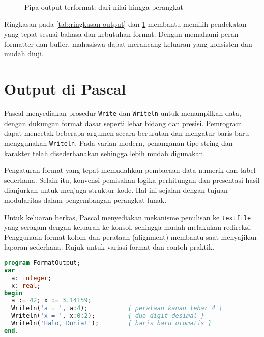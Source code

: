 \documentclass[../main.tex]{subfiles}
\begin{document}
\begin{figure}[h]
  \centering
  \caption{Pipa output terformat: dari nilai hingga perangkat}
  \label{fig:pipa-output}
\end{figure}

Ringkasan pada \cref{tab:ringkasan-output} dan \cref{fig:pipa-output} membantu memilih pendekatan yang tepat sesuai bahasa dan kebutuhan format. Dengan memahami peran formatter dan buffer, mahasiswa dapat merancang keluaran yang konsisten dan mudah diuji.

\section{Output di Pascal}
Pascal menyediakan prosedur \texttt{Write} dan \texttt{Writeln} untuk menampilkan data, dengan dukungan format dasar seperti lebar bidang dan presisi. Pemrogram dapat mencetak beberapa argumen secara berurutan dan mengatur baris baru menggunakan \texttt{Writeln}. Pada varian modern, penanganan tipe string dan karakter telah disederhanakan sehingga lebih mudah digunakan.

Pengaturan format yang tepat memudahkan pembacaan data numerik dan tabel sederhana. Selain itu, konvensi pemisahan logika perhitungan dan presentasi hasil dianjurkan untuk menjaga struktur kode. Hal ini sejalan dengan tujuan modularitas dalam pengembangan perangkat lunak.

Untuk keluaran berkas, Pascal menyediakan mekanisme penulisan ke \texttt{textfile} yang seragam dengan keluaran ke konsol, sehingga mudah melakukan redireksi. Penggunaan format kolom dan perataan (alignment) membantu saat menyajikan laporan sederhana. Rujuk \textcite{w3pascal-io,free-pascal-docs} untuk variasi format dan contoh praktik.

\begin{lstlisting}[language=Pascal, caption={Contoh output Pascal dengan lebar bidang dan presisi}, label={lst:pascal-output}]
program FormatOutput;
var
  a: integer;
  x: real;
begin
  a := 42; x := 3.14159;
  Writeln('a = ', a:4);           { perataan kanan lebar 4 }
  Writeln('x = ', x:0:2);         { dua digit desimal }
  Writeln('Halo, Dunia!');        { baris baru otomatis }
end.
\end{lstlisting}
\end{document}
